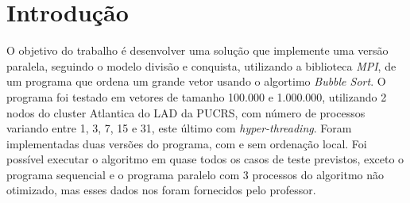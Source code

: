 \section{Introdução}

O objetivo do trabalho é desenvolver uma solução que implemente uma versão paralela, seguindo o modelo divisão e conquista, utilizando a biblioteca \emph{MPI}, de um programa que ordena um grande vetor usando o algortimo \emph{Bubble Sort}. O programa foi testado em vetores de tamanho 100.000 e 1.000.000, utilizando 2 nodos do cluster Atlantica do LAD da PUCRS, com número de processos variando entre 1, 3, 7, 15 e 31, este último com \emph{hyper-threading}. Foram implementadas duas versões do programa, com e sem ordenação local. Foi possível executar o algoritmo em quase todos os casos de teste previstos, exceto o programa sequencial e o programa paralelo com 3 processos do algoritmo não otimizado, mas esses dados nos foram fornecidos pelo professor.